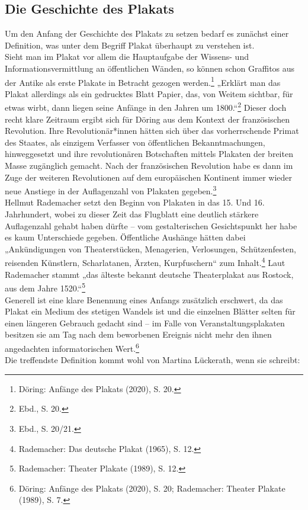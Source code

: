 \documentclass[a4paper,12pt,ngerman]{article}
\begin{document}
\subsection{Die Geschichte des Plakats}
Um den Anfang der Geschichte des Plakats zu setzen bedarf es zunächst einer Definition, was unter dem Begriff Plakat überhaupt zu verstehen ist. \\
Sieht man im Plakat vor allem die Hauptaufgabe der Wissens- und Informationsvermittlung an öffentlichen Wänden, so können schon Graffitos aus der Antike als erste Plakate in Betracht gezogen werden.\footnote{Döring: Anfänge des Plakats (2020), S. 20.}  „Erklärt man das Plakat allerdings als ein gedrucktes Blatt Papier, das, von Weitem sichtbar, für etwas wirbt, dann liegen seine Anfänge in den Jahren um 1800.“\footnote{Ebd., S. 20.}  Dieser doch recht klare Zeitraum ergibt sich für Döring aus dem Kontext der französischen Revolution. Ihre Revolutionär*innen hätten sich über das vorherrschende Primat des Staates, als einzigem Verfasser von öffentlichen Bekanntmachungen, hinweggesetzt und ihre revolutionären Botschaften mittels Plakaten der breiten Masse zugänglich gemacht. Nach der französischen Revolution habe es dann im Zuge der weiteren Revolutionen auf dem europäischen Kontinent immer wieder neue Anstiege in der Auflagenzahl von Plakaten gegeben.\footnote{Ebd., S. 20/21.} \\
Hellmut Rademacher setzt den Beginn von Plakaten in das 15. Und 16. Jahrhundert, wobei zu dieser Zeit das Flugblatt eine deutlich stärkere Auflagenzahl gehabt haben dürfte -- vom gestalterischen Gesichtspunkt her habe es kaum Unterschiede gegeben. Öffentliche Aushänge hätten dabei „Ankündigungen von Theaterstücken, Menagerien, Verlosungen, Schützenfesten, reisenden Künstlern, Scharlatanen, Ärzten, Kurpfuschern“ zum Inhalt.\footnote{Rademacher: Das deutsche Plakat (1965), S. 12.}  Laut Rademacher stammt „das älteste bekannt deutsche Theaterplakat aus Rostock, aus dem Jahre 1520.“\footnote{Rademacher: Theater Plakate (1989), S. 12.} \\
Generell ist eine klare Benennung eines Anfangs zusätzlich erschwert, da das Plakat ein Medium des stetigen Wandels ist und die einzelnen Blätter selten für einen längeren Gebrauch gedacht sind -- im Falle von Veranstaltungsplakaten besitzen sie am Tag nach dem beworbenen Ereignis nicht mehr den ihnen angedachten informatorischen Wert.\footnote{Döring: Anfänge des Plakats (2020), S. 20; Rademacher: Theater Plakate (1989), S. 7.} \\
Die treffendste Definition kommt wohl von Martina Lückerath, wenn sie schreibt:
\end{document}
